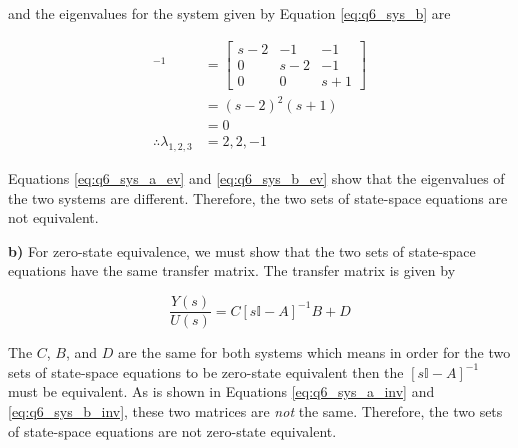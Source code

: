 \noindent and the eigenvalues for the system given by Equation \ref{eq:q6_sys_b}
are

\begin{align}
  [s \mathbb{I} - A]^{-1} &=
  \begin{bmatrix}
    s-2 & -1  & -1 \\
    0   & s-2 & -1 \\
    0   & 0   & s+1
  \end{bmatrix} \label{eq:q6_sys_b_inv} \\
  &= (s-2)^2 (s+1) \nonumber \\
  &= 0 \nonumber \\
  \therefore
  \lambda_{1,2,3} &= 2, 2, -1 \label{eq:q6_sys_b_ev}
\end{align}

Equations \ref{eq:q6_sys_a_ev} and \ref{eq:q6_sys_b_ev} show that the
eigenvalues of the two systems are different. Therefore, the two sets of
state-space equations are not equivalent.

\noindent \textbf{b)} For zero-state equivalence, we must show that the two sets
of state-space equations have the same transfer matrix. The transfer matrix is
given by

\begin{equation} \nonumber
  \dfrac{Y(s)}{U(s)} = C[s\mathbb{I}-A]^{-1}B + D
\end{equation}

The $C$, $B$, and $D$ are the same for both systems which means in order for the
two sets of state-space equations to be zero-state equivalent then the
$[s\mathbb{I}-A]^{-1}$ must be equivalent. As is shown in Equations
\ref{eq:q6_sys_a_inv} and \ref{eq:q6_sys_b_inv}, these two matrices are
\textit{not} the same. Therefore, the two sets of state-space equations are not
zero-state equivalent.

